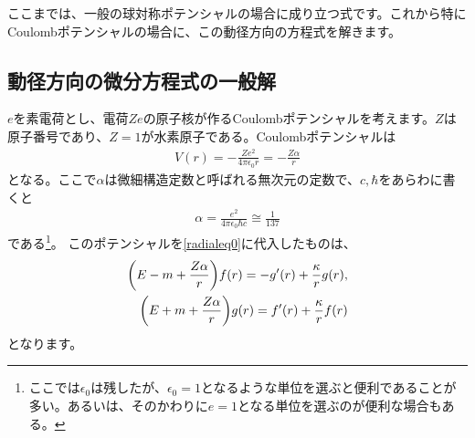 \documentclass[report,paper=a4, fontsize=12pt, line_length=16cm, number_of_lines=33,dvipdfmx]{jlreq}
\numberwithin{equation}{chapter}
\begin{document}
ここまでは、一般の球対称ポテンシャルの場合に成り立つ式です。これから特にCoulombポテンシャルの場合に、この動径方向の方程式を解きます。

\subsection{動径方向の微分方程式の一般解}
$e$を素電荷とし、電荷$Ze$の原子核が作るCoulombポテンシャルを考えます。$Z$は原子番号であり、$Z=1$が水素原子である。Coulombポテンシャルは
\begin{align}
  V(r)=-\frac{Ze^2}{4\pi\epsilon_0 r}=-\frac{Z\alpha}{r}
\end{align}
となる。ここで$\alpha$は微細構造定数と呼ばれる無次元の定数で、$c,\hbar$をあらわに書くと
\begin{align}
  \alpha=\frac{e^2}{4\pi\epsilon_0\hbar c}\cong \frac{1}{137}
\end{align}
である\footnote{ここでは$\epsilon_0$は残したが、$\epsilon_0=1$となるような単位を選ぶと便利であることが多い。あるいは、そのかわりに$e=1$となる単位を選ぶのが便利な場合もある。}。
このポテンシャルを\eqref{radialeq0}に代入したものは、
\begin{align}
  \qty(E-m+\frac{Z\alpha}{r})f(r)=-g'(r)+\frac{\kappa}{r}g(r),\nonumber\\
  \qty(E+m+\frac{Z\alpha}{r})g(r)=f'(r)+\frac{\kappa}{r}f(r)  \label{radialeq}  
\end{align}
となります。
\end{document}
